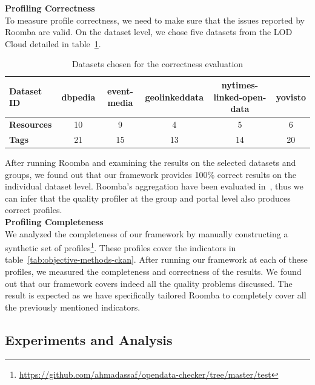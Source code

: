 \documentclass[onecolumn, crcready]{../../Tools/LaTEX/iosart2c}
\begin{document}
\textbf{Profiling Correctness}\\

To measure profile correctness, we need to make sure that the issues reported by Roomba are valid. On the dataset level, we chose five datasets from the LOD Cloud detailed in table~\ref{tab:datases_experiment}.

\begin{table}[ht]
\centering
\begin{tabular}{|l|c|c|c|c|c|}
\hline
\textbf{Dataset ID} & dbpedia & event-media & geolinkeddata & nytimes-linked-open-data & yovisto \\ \hline
\textbf{Resources}  & 10      & 9           & 4             & 5                        & 6       \\ \hline
\textbf{Tags}       & 21      & 15          & 13            & 14                       & 20      \\ \hline
\end{tabular}
\caption{Datasets chosen for the correctness evaluation}
\label{tab:datases_experiment}
\end{table}

After running Roomba and examining the results on the selected datasets and groups, we found out that our framework provides 100\% correct results on the individual dataset level. Roomba's aggregation have been evaluated in~\cite{Assaf:ESWC:PROFILES:15}, thus we can infer that the quality profiler at the group and portal level also produces correct profiles.\\

\textbf{Profiling Completeness}\\

We analyzed the completeness of our framework by manually constructing a synthetic set of profiles\footnote{\url{https://github.com/ahmadassaf/opendata-checker/tree/master/test}}. These profiles cover the indicators in table~\ref{tab:objective-methods-ckan}. After running our framework at each of these profiles, we measured the completeness and correctness of the results. We found out that our framework covers indeed all the quality problems discussed. The result is expected as we have specifically tailored Roomba to completely cover all the previously mentioned indicators.


\subsection{Experiments and Analysis}
\end{document}
